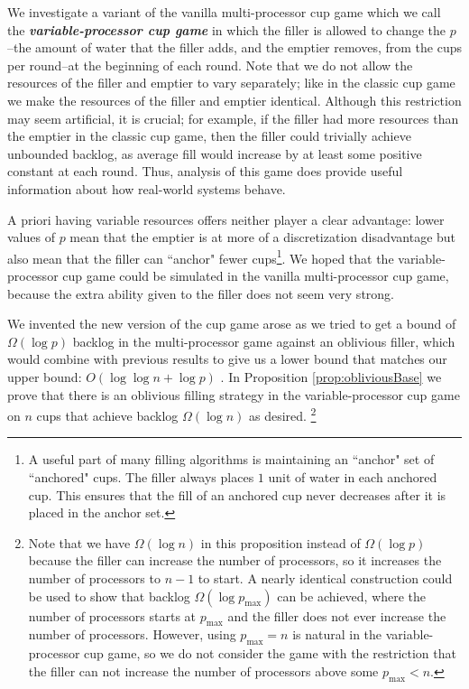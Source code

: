 \documentclass[twocolumn]{article}[11pt]
\newcommand{\defn}[1]{{\textit{\textbf{\boldmath #1}}}}
\begin{document}
We investigate a variant of the vanilla multi-processor
cup game which we call the \defn{variable-processor cup game} in which the
filler is allowed to change the $p$ --the amount of water that the filler adds,
and the emptier removes, from the cups per round--at the beginning of each
round. Note that we do not allow the resources of the filler and emptier to vary separately; 
like in the classic cup game we make the resources of the filler and emptier identical.
Although this restriction may seem artificial, it is crucial; for example, if
the filler had more resources than the emptier in the classic cup game, then
the filler could trivially achieve unbounded backlog, as average fill would
increase by at least some positive constant at each round.
Thus, analysis of this game does provide useful information about how real-world
systems behave.

A priori having variable resources offers neither player a clear advantage:
lower values of $p$ mean that the emptier is at more of a discretization
disadvantage but also mean that the filler can ``anchor" fewer cups\footnote{A
useful part of many filling algorithms is maintaining an ``anchor" set of
``anchored" cups. The filler always places $1$ unit of water in each anchored
cup. This ensures that the fill of an anchored cup never decreases after it is
placed in the anchor set.}. We hoped that the variable-processor cup game could
be simulated in the vanilla multi-processor cup game, because the extra
ability given to the filler does not seem very strong. 

We invented the new version of the cup game arose as we tried to get a bound of
$\Omega(\log p)$ backlog in the multi-processor game against an oblivious
filler, which would combine with previous results to give us a lower bound that
matches our upper bound: $O(\log\log n + \log p)$ \cite{wku20}. In Proposition
\ref{prop:obliviousBase} we prove that there is an oblivious filling strategy
in the variable-processor cup game on $n$ cups that achieve backlog
$\Omega(\log n)$ as desired. \footnote{Note that we have $\Omega(\log n)$ in
  this proposition instead of $\Omega(\log p)$ because the filler can increase
  the number of processors, so it increases the number of processors to $n-1$
  to start. A nearly identical construction could be used to show that backlog
  $\Omega(\log p_{\max})$ can be achieved, where the number of processors
  starts at $p_{\max}$ and the filler does not ever increase the number of
  processors. However, using $p_{\max} = n$ is natural in the
variable-processor cup game, so we do not consider the game with the
restriction that the filler can not increase the number of processors above
some $p_{\max} < n$.}
\end{document}

